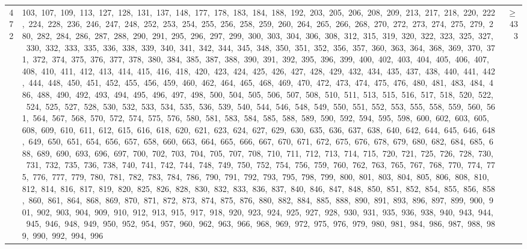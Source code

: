 \begin{longtable}{c|p{}|r}
472 & 103,\ 107,\ 109,\ 113,\ 127,\ 128,\ 131,\ 137,\ 148,\ 177,\ 178,\ 183,\ 184,\ 188,\ 192,\ 203,\ 205,\ 206,\ 208,\ 209,\ 213,\ 217,\ 218,\ 220,\ 222,\ 224,\ 228,\ 236,\ 246,\ 247,\ 248,\ 252,\ 253,\ 254,\ 255,\ 256,\ 258,\ 259,\ 260,\ 264,\ 265,\ 266,\ 268,\ 270,\ 272,\ 273,\ 274,\ 275,\ 279,\ 280,\ 282,\ 284,\ 286,\ 287,\ 288,\ 290,\ 291,\ 295,\ 296,\ 297,\ 299,\ 300,\ 303,\ 304,\ 306,\ 308,\ 312,\ 315,\ 319,\ 320,\ 322,\ 323,\ 325,\ 327,\ 330,\ 332,\ 333,\ 335,\ 336,\ 338,\ 339,\ 340,\ 341,\ 342,\ 344,\ 345,\ 348,\ 350,\ 351,\ 352,\ 356,\ 357,\ 360,\ 363,\ 364,\ 368,\ 369,\ 370,\ 371,\ 372,\ 374,\ 375,\ 376,\ 377,\ 378,\ 380,\ 384,\ 385,\ 387,\ 388,\ 390,\ 391,\ 392,\ 395,\ 396,\ 399,\ 400,\ 402,\ 403,\ 404,\ 405,\ 406,\ 407,\ 408,\ 410,\ 411,\ 412,\ 413,\ 414,\ 415,\ 416,\ 418,\ 420,\ 423,\ 424,\ 425,\ 426,\ 427,\ 428,\ 429,\ 432,\ 434,\ 435,\ 437,\ 438,\ 440,\ 441,\ 442,\ 444,\ 448,\ 450,\ 451,\ 452,\ 455,\ 456,\ 459,\ 460,\ 462,\ 464,\ 465,\ 468,\ 469,\ 470,\ 472,\ 473,\ 474,\ 475,\ 476,\ 480,\ 481,\ 483,\ 484,\ 486,\ 488,\ 490,\ 492,\ 493,\ 494,\ 495,\ 496,\ 497,\ 498,\ 500,\ 504,\ 505,\ 506,\ 507,\ 508,\ 510,\ 511,\ 513,\ 515,\ 516,\ 517,\ 518,\ 520,\ 522,\ 524,\ 525,\ 527,\ 528,\ 530,\ 532,\ 533,\ 534,\ 535,\ 536,\ 539,\ 540,\ 544,\ 546,\ 548,\ 549,\ 550,\ 551,\ 552,\ 553,\ 555,\ 558,\ 559,\ 560,\ 561,\ 564,\ 567,\ 568,\ 570,\ 572,\ 574,\ 575,\ 576,\ 580,\ 581,\ 583,\ 584,\ 585,\ 588,\ 589,\ 590,\ 592,\ 594,\ 595,\ 598,\ 600,\ 602,\ 603,\ 605,\ 608,\ 609,\ 610,\ 611,\ 612,\ 615,\ 616,\ 618,\ 620,\ 621,\ 623,\ 624,\ 627,\ 629,\ 630,\ 635,\ 636,\ 637,\ 638,\ 640,\ 642,\ 644,\ 645,\ 646,\ 648,\ 649,\ 650,\ 651,\ 654,\ 656,\ 657,\ 658,\ 660,\ 663,\ 664,\ 665,\ 666,\ 667,\ 670,\ 671,\ 672,\ 675,\ 676,\ 678,\ 679,\ 680,\ 682,\ 684,\ 685,\ 688,\ 689,\ 690,\ 693,\ 696,\ 697,\ 700,\ 702,\ 703,\ 704,\ 705,\ 707,\ 708,\ 710,\ 711,\ 712,\ 713,\ 714,\ 715,\ 720,\ 721,\ 725,\ 726,\ 728,\ 730,\ 731,\ 732,\ 735,\ 736,\ 738,\ 740,\ 741,\ 742,\ 744,\ 748,\ 749,\ 750,\ 752,\ 754,\ 756,\ 759,\ 760,\ 762,\ 763,\ 765,\ 767,\ 768,\ 770,\ 774,\ 775,\ 776,\ 777,\ 779,\ 780,\ 781,\ 782,\ 783,\ 784,\ 786,\ 790,\ 791,\ 792,\ 793,\ 795,\ 798,\ 799,\ 800,\ 801,\ 803,\ 804,\ 805,\ 806,\ 808,\ 810,\ 812,\ 814,\ 816,\ 817,\ 819,\ 820,\ 825,\ 826,\ 828,\ 830,\ 832,\ 833,\ 836,\ 837,\ 840,\ 846,\ 847,\ 848,\ 850,\ 851,\ 852,\ 854,\ 855,\ 856,\ 858,\ 860,\ 861,\ 864,\ 868,\ 869,\ 870,\ 871,\ 872,\ 873,\ 874,\ 875,\ 876,\ 880,\ 882,\ 884,\ 885,\ 888,\ 890,\ 891,\ 893,\ 896,\ 897,\ 899,\ 900,\ 901,\ 902,\ 903,\ 904,\ 909,\ 910,\ 912,\ 913,\ 915,\ 917,\ 918,\ 920,\ 923,\ 924,\ 925,\ 927,\ 928,\ 930,\ 931,\ 935,\ 936,\ 938,\ 940,\ 943,\ 944,\ 945,\ 946,\ 948,\ 949,\ 950,\ 952,\ 954,\ 957,\ 960,\ 962,\ 963,\ 966,\ 968,\ 969,\ 972,\ 975,\ 976,\ 979,\ 980,\ 981,\ 984,\ 986,\ 987,\ 988,\ 989,\ 990,\ 992,\ 994,\ 996 & $\ge$ 433 \\

\end{longtable}
